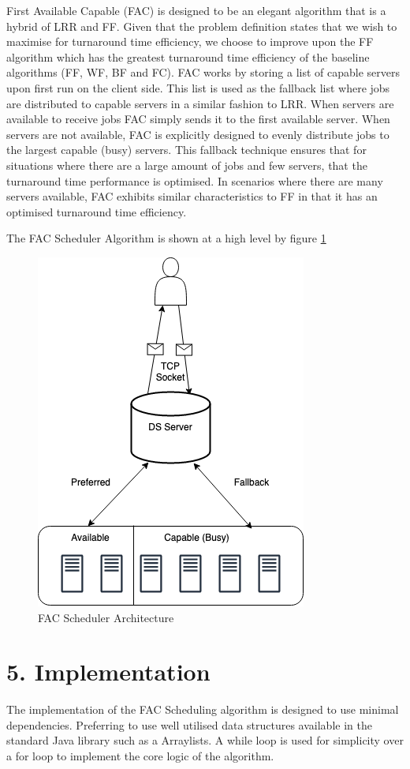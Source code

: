 \documentclass[a4paper]{article} %
\begin{document}
First Available Capable (FAC) is designed to be an elegant algorithm that is a hybrid of LRR and FF. Given that the problem definition states that we wish to maximise for turnaround time efficiency, we choose to improve upon the FF algorithm which has the greatest turnaround time efficiency of the baseline algorithms (FF, WF, BF and FC). FAC works by storing a list of capable servers upon first run on the client side. This list is used as the fallback list where jobs are distributed to capable servers in a similar fashion to LRR. When servers are available to receive jobs FAC simply sends it to the first available server. When servers are not available, FAC is explicitly designed to evenly distribute jobs to the largest capable (busy) servers. This fallback technique ensures that for situations where there are a large amount of jobs and few servers, that the turnaround time performance is optimised. In scenarios where there are many servers available, FAC exhibits similar characteristics to FF in that it has an optimised turnaround time efficiency.
\newline

The FAC Scheduler Algorithm is shown at a high level by figure \ref{DSSIM}
\begin{figure}[H]
    \centering
    \includegraphics[scale=0.4]{images/fac.png}
    \caption{FAC Scheduler Architecture}
    \label{DSSIM}
\end{figure}


\section*{5. Implementation}
The implementation of the FAC Scheduling algorithm is designed to use minimal dependencies. Preferring to use well utilised data structures available in the standard Java library such as a Arraylists. A while loop is used for simplicity over a for loop to implement the core logic of the algorithm.
\end{document}

